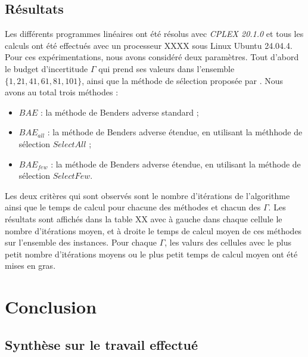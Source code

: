 \documentclass[12pt, a4paper, twoside]{report}
\numberwithin{equation}{section}
\begin{document}
	\subsection{Résultats}
	
	Les différents programmes linéaires ont été résolus avec \textit{CPLEX 20.1.0} et tous les calculs ont été effectués avec un processeur XXXX sous Linux Ubuntu 24.04.4. Pour ces expérimentations, nous avons considéré deux paramètres. Tout d'abord le budget d'incertitude $\Gamma$ qui prend ses valeurs dans l'ensemble $\{1, 21, 41, 61, 81,101\}$, ainsi que la méthode de sélection proposée par \cite{portoleau:tel-04631599}. Nous avons au total trois méthodes :
	
	\begin{itemize}
		\item[] $BAE$ : la méthode de Benders adverse standard ;
		\item[] $BAE_{all}$ : la méthode de Benders adverse étendue, en utilisant la méthhode de sélection $SelectAll$ ;
		\item[] $BAE_{few}$ : la méthode de Benders adverse étendue, en utilisant la méthode de sélection $SelectFew$.
	\end{itemize}
	
	Les deux critères qui sont observés sont le nombre d'itérations de l'algorithme ainsi que le temps de calcul pour chacune des méthodes et chacun des $\Gamma$. Les résultats sont affichés dans la table XX avec à gauche dans chaque cellule le nombre d'itérations moyen, et à droite le temps de calcul moyen de ces méthodes sur l'ensemble des instances. Pour chaque $\Gamma$, les valurs des cellules avec le plus petit nombre d'itérations moyens ou le plus petit temps de calcul moyen ont été mises en gras.
	
	\clearpage
	\section{Conclusion}
	
	
	\subsection{Synthèse sur le travail effectué}
	
	
\end{document}
